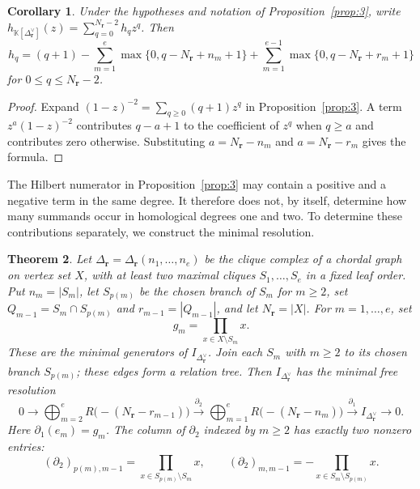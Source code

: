 \documentclass[11pt]{amsart}
\newtheorem{theorem}{Theorem}[section]
\newtheorem{corollary}[theorem]{Corollary}
\theoremstyle{definition}
\theoremstyle{remark}
\newcommand{\K}{\mathbb K}
\newcommand{\SR}[1]{\K[#1]}
\begin{document}
	\begin{corollary}\label{cor:6}
		Under the hypotheses and notation of Proposition~\ref{prop:3}, write $h_{\SR{\Delta_{\mathbf r}^\vee}}(z)=\sum_{q=0}^{N_{\mathbf r}-2}h_qz^q$. Then
		\[
		h_q
		=
		(q+1)
		-
		\sum_{m=1}^e\max\{0,q-N_{\mathbf r}+n_m+1\}
		+
		\sum_{m=1}^{e-1}\max\{0,q-N_{\mathbf r}+r_m+1\}
		\]
		for $0\le q\le N_{\mathbf r}-2$.
	\end{corollary}
	
	\begin{proof}
		Expand $(1-z)^{-2}=\sum_{q\ge0}(q+1)z^q$ in Proposition~\ref{prop:3}. A term $z^a(1-z)^{-2}$ contributes $q-a+1$ to the coefficient of $z^q$ when $q\ge a$ and contributes zero otherwise. Substituting $a=N_{\mathbf r}-n_m$ and $a=N_{\mathbf r}-r_m$ gives the formula.
	\end{proof}
	
	The Hilbert numerator in Proposition~\ref{prop:3} may contain a positive and a negative term in the same degree. It therefore does not, by itself, determine how many summands occur in homological degrees one and two. To determine these contributions separately, we construct the minimal resolution.
	
	\begin{theorem}\label{thm:4}
		Let $\Delta_{\mathbf r}=\Delta_{\mathbf r}(n_1,\ldots,n_e)$ be the clique complex of a chordal graph on vertex set $X$, with at least two maximal cliques $S_1,\ldots,S_e$ in a fixed leaf order. Put $n_m=|S_m|$, let $S_{p(m)}$ be the chosen branch of $S_m$ for $m\ge2$, set $Q_{m-1}=S_m\cap S_{p(m)}$ and $r_{m-1}=|Q_{m-1}|$, and let $N_{\mathbf r}=|X|$. For $m=1,\ldots,e$, set
		\[
		g_m=\prod_{x\in X\setminus S_m}x.
		\]
		These are the minimal generators of $I_{\Delta_{\mathbf r}^\vee}$. Join each $S_m$ with $m\ge2$ to its chosen branch $S_{p(m)}$; these edges form a relation tree. Then $I_{\Delta_{\mathbf r}^\vee}$ has the minimal free resolution
		\[
		0\longrightarrow
		\bigoplus_{m=2}^e R\bigl(-(N_{\mathbf r}-r_{m-1})\bigr)
		\xrightarrow{\partial_2}
		\bigoplus_{m=1}^e R\bigl(-(N_{\mathbf r}-n_m)\bigr)
		\xrightarrow{\partial_1}
		I_{\Delta_{\mathbf r}^\vee}
		\longrightarrow0.
		\]
		Here $\partial_1(e_m)=g_m$. The column of $\partial_2$ indexed by $m\ge2$ has exactly two nonzero entries:
		\[
		(\partial_2)_{p(m),m-1}
		=
		\prod_{x\in S_{p(m)}\setminus S_m}x,
		\qquad
		(\partial_2)_{m,m-1}
		=
		-\prod_{x\in S_m\setminus S_{p(m)}}x.
		\]
	\end{theorem}
	
\end{document}
